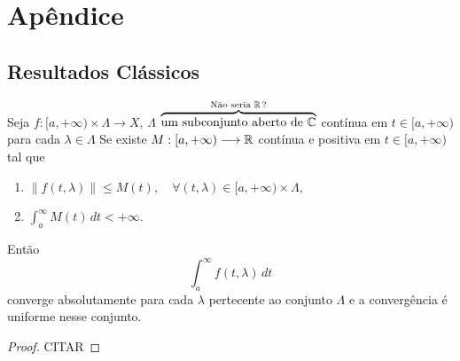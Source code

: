 \chapter{Apêndice}

\section{Resultados Clássicos}


\begin{proposition}\label{TWeierstrass}
Seja $f:[a,+\infty)\times \Lambda\longrightarrow X$, $\Lambda$ 
$\overbrace{\text{um subconjunto aberto de }\mathbb{C}}^{\text{Não seria } \mathbb{R}\,?}$ 
 contínua em $t\in [a,+\infty)$ para cada $\lambda \in \Lambda$ Se existe $M:[a,+\infty)\longrightarrow \mathbb{R}$ contínua e positiva em $t\in [a,+\infty)$ tal que
\begin{enumerate}[$(i)$]
\item $\|f(t,\lambda)\|\leq M(t),\quad \forall (t,\lambda)\in [a,+\infty)\times \Lambda$,
\item $\displaystyle \int_a^\infty M(t)\, dt<+\infty$.
\end{enumerate} 
Então 
\[\int_a^\infty f(t,\lambda)\, dt\]
converge absolutamente para cada $\lambda $ pertecente ao conjunto $\Lambda$ e a convergência é uniforme nesse conjunto.
\end{proposition}
\begin{proof}
{\color{red}CITAR}
\end{proof}